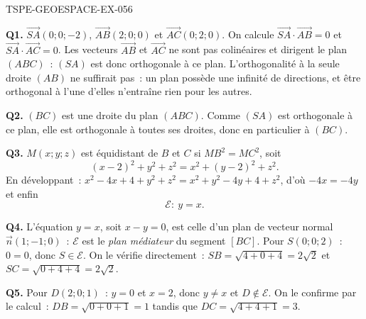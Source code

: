 \begin{corrige}{TSPE-GEOESPACE-EX-056}

\textbf{Q1.} $\vec{SA}(0;0;-2)$, $\vec{AB}(2;0;0)$ et $\vec{AC}(0;2;0)$. On
calcule $\vec{SA}\cdot\vec{AB}=0$ et $\vec{SA}\cdot\vec{AC}=0$. Les vecteurs
$\vec{AB}$ et $\vec{AC}$ ne sont pas colinéaires et dirigent le plan $(ABC)$~:
$(SA)$ est donc orthogonale à ce plan. L'orthogonalité à la seule droite
$(AB)$ ne suffirait pas~: un plan possède une infinité de directions, et être
orthogonal à l'une d'elles n'entraîne rien pour les autres.

\textbf{Q2.} $(BC)$ est une droite du plan $(ABC)$. Comme $(SA)$ est
orthogonale à ce plan, elle est orthogonale à toutes ses droites, donc en
particulier à $(BC)$.

\textbf{Q3.} $M(x;y;z)$ est équidistant de $B$ et $C$ si $MB^2=MC^2$, soit
\[
  (x-2)^2+y^2+z^2=x^2+(y-2)^2+z^2 .
\]
En développant~: $x^2-4x+4+y^2+z^2=x^2+y^2-4y+4+z^2$, d'où $-4x=-4y$ et enfin
\[
  \mathcal{E}:\ y=x .
\]

\textbf{Q4.} L'équation $y=x$, soit $x-y=0$, est celle d'un plan de vecteur
normal $\vec{n}(1;-1;0)$~: $\mathcal{E}$ est le \emph{plan médiateur} du
segment $[BC]$. Pour $S(0;0;2)$~: $0=0$, donc $S\in\mathcal{E}$. On le
vérifie directement~: $SB=\sqrt{4+0+4}=2\sqrt2$ et
$SC=\sqrt{0+4+4}=2\sqrt2$.

\textbf{Q5.} Pour $D(2;0;1)$~: $y=0$ et $x=2$, donc $y\neq x$ et
$D\notin\mathcal{E}$. On le confirme par le calcul~: $DB=\sqrt{0+0+1}=1$
tandis que $DC=\sqrt{4+4+1}=3$.

\end{corrige}

